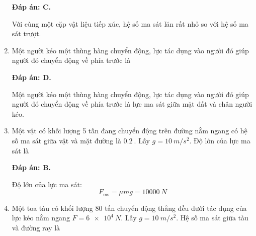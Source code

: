 \begin{enumerate}[label=\bfseries Câu \arabic*:]
	\hideall
	{	\textbf{Đáp án: C.}
		
		Với cùng một cặp vật liệu tiếp xúc, hệ số ma sát lăn rất nhỏ so với hệ số ma sát trượt.
	}
	\item {}
	
	
	{Một người kéo một thùng hàng chuyển động, lực tác dụng vào người đó giúp người đó chuyển động về phía trước là
	}
	
	\hideall
	{	\textbf{Đáp án: D.}
		
		Một người kéo một thùng hàng chuyển động, lực tác dụng vào người đó giúp người đó chuyển động về phía trước là lực ma sát giữa mặt đất và chân người kéo.
	}
	\item {}
	
	
	{Một vật có khối lượng 5 tấn đang chuyển động trên đường nằm ngang có hệ số ma sát giữa vật và mặt đường là $\SI{0.2}{}$. Lấy $g=\SI{10}{m/s^2}$. Độ lớn của lực ma sát là
	}
	
	\hideall
	{	\textbf{Đáp án: B.}
		
		Độ lớn của lực ma sát:
		$$F_\text{ms} = \mu m g = \SI{10000}{N}$$
	}
	\item {}
	
	
	{Một toa tàu có khối lượng 80 tấn chuyển động thẳng đều dưới tác dụng của lực kéo nằm ngang $F=\SI{6e4}{N}$. Lấy $g=\SI{10}{m/s^2}$. Hệ số ma sát giữa tàu và đường ray là
	}
	

\end{enumerate}
